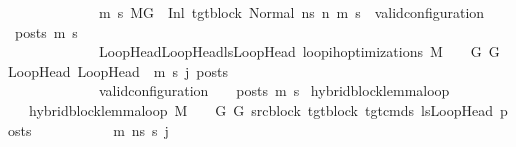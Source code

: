 \begin{isabellebody}
\ \ \ \ \ \ \ \ \ \ \ \ \ {\isacharparenleft}{\kern0pt}{\isasymforall}m{}{\isacharprime}{\kern0pt}\ s{}{\isacharprime}{\kern0pt}{\isachardot}{\kern0pt}\ {\isacharparenleft}{\kern0pt}M{\isacharcomma}{\kern0pt}{\isasymLambda}{\isacharcomma}{\kern0pt}{\isasymGamma}{\isacharcomma}{\kern0pt}{\isasymOmega}{\isacharcomma}{\kern0pt}G{\isacharprime}{\kern0pt}\ {\isasymturnstile}\ {\isacharparenleft}{\kern0pt}Inl\ tgt{\isacharunderscore}{\kern0pt}block{\isacharcomma}{\kern0pt}\ {\isacharparenleft}{\kern0pt}Normal\ ns{\isacharparenright}{\kern0pt}{\isacharparenright}{\kern0pt}\ {\isacharminus}{\kern0pt}n{\isasymrightarrow}{\isacharasterisk}{\kern0pt}\ {\isacharparenleft}{\kern0pt}m{}{\isacharprime}{\kern0pt}{\isacharcomma}{\kern0pt}\ s{}{\isacharprime}{\kern0pt}{\isacharparenright}{\kern0pt}{\isacharparenright}{\kern0pt}\ {\isasymlongrightarrow}\ valid{\isacharunderscore}{\kern0pt}configuration\ {\isasymLambda}\ {\isasymGamma}\ {\isasymOmega}\ posts\ m{}{\isacharprime}{\kern0pt}\ s{}{\isacharprime}{\kern0pt}{\isacharparenright}{\kern0pt}\ {\isasymlongrightarrow}\isanewline
\ \ \ \ \ \ \ \ \ \ \ \ \ {\isacharparenleft}{\kern0pt}{\isasymforall}{\isacharparenleft}{\kern0pt}LoopHead{\isacharcomma}{\kern0pt}LoopHead{\isacharprime}{\kern0pt}{\isacharparenright}{\kern0pt}{\isasymin}lsLoopHead{\isachardot}{\kern0pt}\ loop{\isacharunderscore}{\kern0pt}ih{\isacharunderscore}{\kern0pt}optimizations\ M\ {\isasymLambda}\ {\isasymGamma}\ {\isasymOmega}\ G\ G{\isacharprime}{\kern0pt}\ LoopHead\ LoopHead{\isacharprime}{\kern0pt}\ \ m{\isacharprime}{\kern0pt}\ s{\isacharprime}{\kern0pt}\ j\ posts{\isacharparenright}{\kern0pt}\ {\isasymlongrightarrow}\isanewline
\ \ \ \ \ \ \ \ \ \ \ \ \ valid{\isacharunderscore}{\kern0pt}configuration\ {\isasymLambda}\ {\isasymGamma}\ {\isasymOmega}\ posts\ m{\isacharprime}{\kern0pt}\ s{\isacharprime}{\kern0pt}{\isachardoublequoteclose}\isanewline
\isanewline
{}\isamarkupfalse%
\ hybrid{\isacharunderscore}{\kern0pt}block{\isacharunderscore}{\kern0pt}lemma{\isacharunderscore}{\kern0pt}loop\isanewline
\ \ \ {\isachardoublequoteopen}hybrid{\isacharunderscore}{\kern0pt}block{\isacharunderscore}{\kern0pt}lemma{\isacharunderscore}{\kern0pt}loop\ M\ {\isasymLambda}\ {\isasymGamma}\ {\isasymOmega}\ G\ G{\isacharprime}{\kern0pt}\ src{\isacharunderscore}{\kern0pt}block\ tgt{\isacharunderscore}{\kern0pt}block\ tgt{\isacharunderscore}{\kern0pt}cmds\ lsLoopHead\ posts{\isasymequiv}\ \isanewline
\ \ \ \ \ \ \ \ \ \ {\isasymforall}m{\isacharprime}{\kern0pt}\ ns\ s{\isacharprime}{\kern0pt}\ j{\isachardot}{\kern0pt}\ \ \isanewline

\end{isabellebody}
